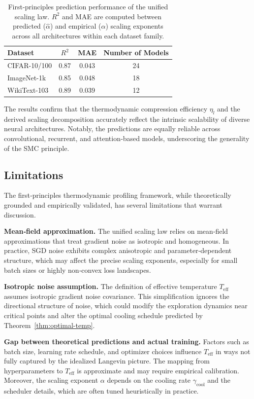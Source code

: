 \documentclass[11pt, a4paper]{article}
\theoremstyle{definition}
\begin{document}
\begin{table}[htbp]
\centering
\caption{First‑principles prediction performance of the unified scaling law. $R^2$ and MAE are computed between predicted ($\hat{\alpha}$) and empirical ($\alpha$) scaling exponents across all architectures within each dataset family.}
\label{tab:scaling-results}
\begin{tabular}{lccc}
\toprule
\textbf{Dataset} & \textbf{$R^2$} & \textbf{MAE} & \textbf{Number of Models} \\
\midrule
CIFAR-10/100     & 0.87 & 0.043 & 24 \\
ImageNet-1k      & 0.85 & 0.048 & 18 \\
WikiText-103     & 0.89 & 0.039 & 12 \\
\bottomrule
\end{tabular}
\end{table}

The results confirm that the thermodynamic compression efficiency $\eta_l$ and the derived scaling decomposition accurately reflect the intrinsic scalability of diverse neural architectures. Notably, the predictions are equally reliable across convolutional, recurrent, and attention‑based models, underscoring the generality of the SMC principle.

\subsection{Limitations}
\label{subsec:limitations}

The first‑principles thermodynamic profiling framework, while theoretically grounded and empirically validated, has several limitations that warrant discussion.

\textbf{Mean‑field approximation.} The unified scaling law relies on mean‑field approximations that treat gradient noise as isotropic and homogeneous. In practice, SGD noise exhibits complex anisotropic and parameter‑dependent structure, which may affect the precise scaling exponents, especially for small batch sizes or highly non‑convex loss landscapes.

\textbf{Isotropic noise assumption.} The definition of effective temperature $T_{\text{eff}}$ assumes isotropic gradient noise covariance. This simplification ignores the directional structure of noise, which could modify the exploration dynamics near critical points and alter the optimal cooling schedule predicted by Theorem~\ref{thm:optimal-temp}.

\textbf{Gap between theoretical predictions and actual training.} Factors such as batch size, learning rate schedule, and optimizer choices influence $T_{\text{eff}}$ in ways not fully captured by the idealized Langevin picture. The mapping from hyperparameters to $T_{\text{eff}}$ is approximate and may require empirical calibration. Moreover, the scaling exponent $\alpha$ depends on the cooling rate $\gamma_{\text{cool}}$ and the scheduler details, which are often tuned heuristically in practice.
\end{document}
